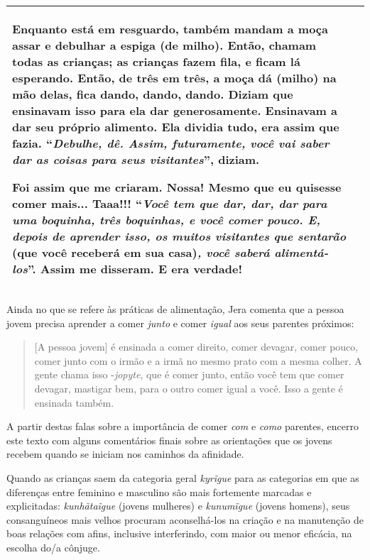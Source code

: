 \begin{longtable}[]{@{}ll@{}}
\begin{minipage}[t]{0.48\columnwidth}
Enquanto está em resguardo, também mandam a moça assar e debulhar a
espiga (de milho). Então, chamam todas as crianças; as crianças fazem
fila, e ficam lá esperando. Então, de três em três, a moça dá (milho) na
mão delas, fica dando, dando, dando. Diziam que ensinavam isso para ela
dar generosamente. Ensinavam a dar seu próprio alimento. Ela dividia
tudo, era assim que fazia. ``\emph{Debulhe, dê. Assim, futuramente, você
vai saber dar as coisas para seus visitantes}'', diziam.

Foi assim que me criaram. Nossa! Mesmo que eu quisesse comer mais...
Taaa!!! ``\emph{Você tem que dar, dar, dar para uma boquinha, três
boquinhas, e você comer pouco. E, depois de aprender isso, os muitos
visitantes} \emph{que sentarão} (que você receberá em sua casa)\emph{,
você saberá alimentá-los}''. Assim me disseram. E era verdade!\strut
\end{minipage}\tabularnewline
\bottomrule
\end{longtable}

Ainda no que se refere às práticas de alimentação, Jera comenta que a
pessoa jovem precisa aprender a comer \emph{junto} e comer \emph{igual}
aos seus parentes próximos:

\begin{quote}
{[}A pessoa jovem{]} é ensinada a comer direito, comer devagar, comer
pouco, comer junto com o irmão e a irmã no mesmo prato com a mesma
colher. A gente chama isso -\emph{jopyte}, que é comer junto, então você
tem que comer devagar, mastigar bem, para o outro comer igual a você.
Isso a gente é ensinada também.
\end{quote}

A partir destas falas sobre a importância de comer \emph{com} e
\emph{como} parentes, encerro este texto com alguns comentários finais
sobre as orientações que os jovens recebem quando se iniciam nos
caminhos da afinidade.

Quando as crianças saem da categoria geral \emph{kyrĩgue} para as
categorias em que as diferenças entre feminino e masculino são mais
fortemente marcadas e explicitadas: \emph{kunhãtaĩgue} (jovens mulheres)
e \emph{kunumĩgue} (jovens homens), seus consanguíneos mais velhos
procuram aconselhá-los na criação e na manutenção de boas relações com
afins, inclusive interferindo, com maior ou menor eficácia, na escolha
do/a cônjuge.

